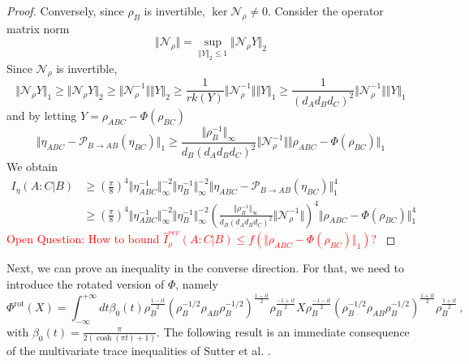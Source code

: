 \documentclass[11pt]{article}
\theoremstyle{newdefinition}
\theoremstyle{newplain}
\theoremstyle{myplain}
\DeclareMathOperator{\1}{\mathds{1}}
\begin{document}
{\begin{proof}
    Conversely, since $\rho_B$ is invertible,  $\ker \mathcal{N}_{\rho}\neq 0$. Consider the operator matrix norm
    \begin{equation}
        \Vert \mathcal{N}_{\rho}\Vert=\sup_{\Vert Y \Vert_2 \leq 1}\Vert \mathcal{N}_{\rho} Y\Vert_2
    \end{equation}
    Since $\mathcal{N}_{\rho}$ is invertible,
    \begin{equation}
        \Vert \mathcal{N}_{\rho} Y\Vert_1\geq \Vert \mathcal{N}_{\rho} Y\Vert_2\geq \Vert \mathcal{N}_{\rho}^{-1}\Vert \Vert Y \Vert_2\geq  \frac{1}{rk(Y)}\Vert \mathcal{N}_{\rho}^{-1}\Vert \Vert Y \Vert_1\geq   \frac{1}{(d_Ad_Bd_C)^2}\Vert \mathcal{N}_{\rho}^{-1}\Vert \Vert Y \Vert_1
    \end{equation} 
and by letting $Y=\rho_{ABC}-\Phi(\rho_{BC})$
\begin{equation}
    \Vert \eta_{ABC}-\mathcal{P}_{B\rightarrow AB}(\eta_{BC})\Vert_1 \geq \frac{\Vert \rho_B^{-1} \Vert_{\infty}}{d_B (d_Ad_Bd_C)^2}\Vert \mathcal{N}_{\rho}^{-1}\Vert \Vert \rho_{ABC}-\Phi(\rho_{BC})\Vert_1
\end{equation}
We obtain
\begin{equation}
    \begin{split}
        I_{\eta}(A:C\vert B)&\geq \left(\frac{\pi}{8}\right)^4\Vert \eta_{ABC}^{-1}\Vert_{\infty}^{-2} \Vert \eta_{B}^{-1}\Vert_{\infty}^{-2}\Vert \eta_{ABC}-\mathcal{P}_{B\rightarrow AB}(\eta_{BC})\Vert_1^4\\
        &\geq \left(\frac{\pi}{8}\right)^4\Vert \eta_{ABC}^{-1}\Vert_{\infty}^{-2} \Vert \eta_{B}^{-1}\Vert_{\infty}^{-2}\left(\frac{\Vert \rho_B^{-1} \Vert_{\infty}}{d_B (d_Ad_Bd_C)^2}\Vert \mathcal{N}_{\rho}^{-1}\Vert \right)^4\Vert  \rho_{ABC}-\Phi(\rho_{BC})\Vert_1^4
    \end{split}
\end{equation}
   \textcolor{red}{ Open Question: How to bound $\widehat{I}^{rev}_{\rho}(A:C | B)\leq f(\Vert  \rho_{ABC}-\Phi(\rho_{BC})\Vert_1)?$
    }

\end{proof}


Next, we can prove an inequality in the converse direction. For that, we need to introduce the rotated version of $\Phi$, namely
\begin{equation}
    \Phi^{\text{rot}} (X) = \int_{-\infty}^{+\infty} dt \beta_0(t) \rho_B^{\frac{1-it}{2}}(\rho_B^{-1/2}\rho_{AB}\rho_B^{-1/2})^{\frac{1-it}{2}}\rho_B^{\frac{-1+it}{2}}X\rho_B^{\frac{-1-it}{2}}(\rho_B^{-1/2}\rho_{AB}\rho_B^{-1/2})^{\frac{1+it}{2}}\rho_B^{\frac{1+it}{2}} \, , 
\end{equation}
with $\beta_0(t)= \frac{\pi}{2( \cosh (\pi t) +1)}$.
The following result is an immediate consequence of the multivariate trace inequalities of Sutter et al. \cite{Sutter2017b}.

}
\end{document}
